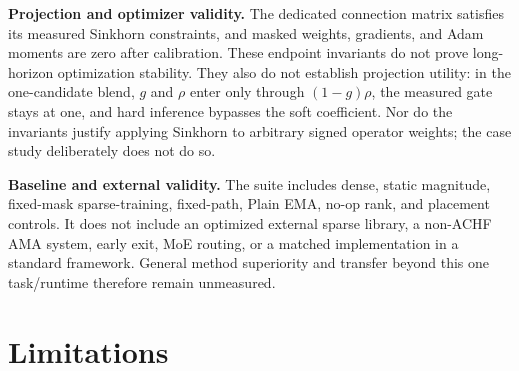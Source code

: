 \documentclass{article}
\newcommand{\ama}{\textsc{AMA}}
\begin{document}
\textbf{Projection and optimizer validity.}
The dedicated connection matrix satisfies its measured Sinkhorn constraints,
and masked weights, gradients, and Adam moments are zero after calibration.
These endpoint invariants do not prove long-horizon optimization stability.
They also do not establish projection utility: in the one-candidate blend,
$g$ and $\rho$ enter only through $(1-g)\rho$, the measured gate stays at one,
and hard inference bypasses the soft coefficient. Nor do the invariants justify
applying Sinkhorn to arbitrary signed operator weights; the case study
deliberately does not do so.

\textbf{Baseline and external validity.}
The suite includes dense, static magnitude, fixed-mask sparse-training,
fixed-path, Plain EMA, no-op rank, and placement controls. It does not include
an optimized external sparse library, a non-ACHF \ama{} system, early exit,
MoE routing, or a matched implementation in a standard framework. General
method superiority and transfer beyond this one task/runtime therefore remain
unmeasured.

\section{Limitations}
\end{document}
